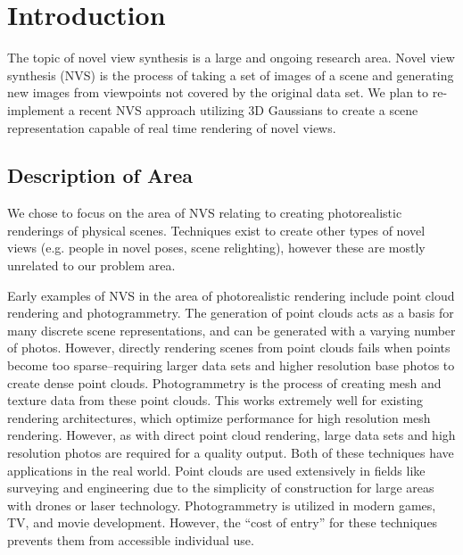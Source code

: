 \documentclass[12pt, a4paper, twocolumn]{article}
\begin{document}

\twocolumn[
  \begin{@twocolumnfalse}
    \maketitle
  \end{@twocolumnfalse}
]


\section{Introduction}

The topic of novel view synthesis is a large and ongoing research area. Novel view synthesis (NVS) is the process of taking a set of images of a scene and generating new images from viewpoints not covered by the original data set. We plan to re-implement a recent NVS approach utilizing 3D Gaussians to create a scene representation capable of real time rendering of novel views.  

\subsection{Description of Area}
We chose to focus on the area of NVS relating to creating photorealistic renderings of physical scenes. Techniques exist to create other types of novel views (e.g. people in novel poses, scene relighting), however these are mostly unrelated to our problem area. 

Early examples of NVS in the area of photorealistic rendering include point cloud rendering and photogrammetry. The generation of point clouds acts as a basis for many discrete scene representations, and can be generated with a varying number of photos. However, directly rendering scenes from point clouds fails when points become too sparse--requiring larger data sets and higher resolution base photos to create dense point clouds. Photogrammetry is the process of creating mesh and texture data from these point clouds. This works extremely well for existing rendering architectures, which optimize performance for high resolution mesh rendering. However, as with direct point cloud rendering, large data sets and high resolution photos are required for a quality output. Both of these techniques have applications in the real world. Point clouds are used extensively in fields like surveying and engineering due to the simplicity of construction for large areas with drones or laser technology. Photogrammetry is utilized in modern games, TV, and movie development. However, the ``cost of entry'' for these techniques prevents them from accessible individual use.
\end{document}
